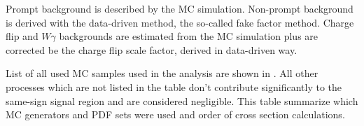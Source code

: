 Prompt background is described by the MC simulation. 
Non-prompt background is derived with the data-driven method, the so-called fake factor method.
Charge flip and $W\gamma$ backgrounds are estimated from the MC simulation plus are corrected be the charge flip scale factor, derived in data-driven way.

List of all used MC samples used in the analysis are shown in . All other processes which are not listed in the table don't contribute
significantly to the same-sign signal region and are considered negligible.
This table summarize which MC generators and PDF sets were used and order of cross section calculations.

